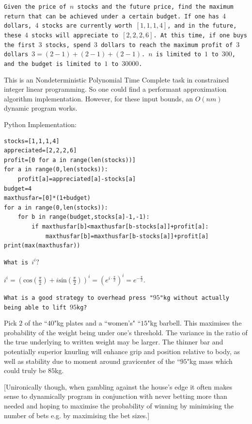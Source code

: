 \texttt{Given the price of $n$ stocks and the future price, find the maximum return that can be achieved under a certain budget. If one has $4$ dollars, $4$ stocks are currently worth $[1,1,1,4]$, and in the future, these $4$ stocks will appreciate to $[2,2,2,6]$. At this time, if one buys the first $3$ stocks, spend $3$ dollars to reach the maximum profit of $3$ dollars $3=(2-1)+(2-1)+(2-1)$. $n$ is limited to $1$ to $300$, and the budget is limited to $1$ to $30000$.}

This is an Nondeterministic Polynomial Time Complete task in constrained integer linear programming. So one could find a performant approximation algorithm implementation. However, for these input bounds, an $O(nm)$ dynamic program works.

Python Implementation:

\begin{verbatim}
stocks=[1,1,1,4]
appreciated=[2,2,2,6]
profit=[0 for a in range(len(stocks))]
for a in range(0,len(stocks)):
    profit[a]=appreciated[a]-stocks[a]
budget=4
maxthusfar=[0]*(1+budget)
for a in range(0,len(stocks)):
    for b in range(budget,stocks[a]-1,-1):
        if maxthusfar[b]<maxthusfar[b-stocks[a]]+profit[a]:
            maxthusfar[b]=maxthusfar[b-stocks[a]]+profit[a]
print(max(maxthusfar))
\end{verbatim}

\texttt{What is $i^i?$}

$i^i = \left ( \text{cos}\left( \frac{\pi}{2} \right)+i \text{sin}\left( \frac{\pi}{2} \right) \right )^i = \left ( e^{i \cdot \frac{\pi}{2}} \right )^i = \boxed{e^{-\frac{\pi}{2}}}$.

\texttt{What is a good strategy to overhead press "$95$"kg without actually being able to lift $95$kg?}

Pick $2$ of the ``$40$"kg plates and a ``women's" ``$15$"kg barbell. This maximises the probability of the weight being under one's threshold. The variance in the ratio of the true underlying to written weight may be larger. The thinner bar and potentially superior knurling will enhance grip and position relative to body, as well as stability due to moment around gravicenter of the ``$95$"kg mass which could truly be $85$kg.

[Unironically though, when gambling against the house's edge it often makes sense to dynamically program in conjunction with never betting more than needed and hoping to maximise the probability of winning by minimising the number of bets e.g. by maximising the bet sizes.]

